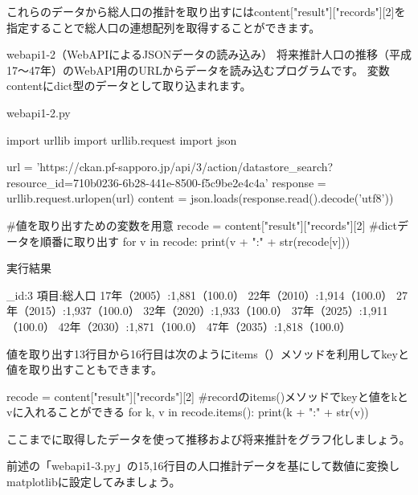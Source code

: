 これらのデータから総人口の推計を取り出すにはcontent["result"]["records"][2]を指定することで総人口の連想配列を取得することができます。
\begin{pabox}{webapi1-2（WebAPIによるJSONデータの読み込み）}
将来推計人口の推移（平成17～47年）のWebAPI用のURLからデータを読み込むプログラムです。
変数contentにdict型のデータとして取り込まれます。
\begin{legbox}{webapi1-2.py}
\begin{listing}{1}
import urllib
import urllib.request
import json

url = 'https://ckan.pf-sapporo.jp/api/3/action/datastore_search?
       resource_id=710b0236-6b28-441e-8500-f5c9be2e4c4a'
response = urllib.request.urlopen(url)
content = json.loads(response.read().decode('utf8'))


#値を取り出すための変数を用意
recode = content["result"]["records"][2]
#dictデータを順番に取り出す
for v in recode:
    print(v + ":" + str(recode[v]))
\end{listing}
実行結果
\begin{listing}{1}
_id:3
項目:総人口
17年（2005）:1,881（100.0）
22年（2010）:1,914（100.0）
27年（2015）:1,937（100.0）
32年（2020）:1,933（100.0）
37年（2025）:1,911（100.0）
42年（2030）:1,871（100.0）
47年（2035）:1,818（100.0）
\end{listing}
値を取り出す13行目から16行目は次のようにitems（）メソッドを利用してkeyと値を取り出すこともできます。
\begin{listing}{1}
recode = content["result"]["records"][2]
#recordのitems()メソッドでkeyと値をkとvに入れることができる
for k, v in recode.items():
    print(k + ":" + str(v))
\end{listing}
\end{legbox}
\end{pabox}

ここまでに取得したデータを使って推移および将来推計をグラフ化しましょう。

前述の「webapi1-3.py」の15,16行目の人口推計データを基にして数値に変換しmatplotlibに設定してみましょう。

